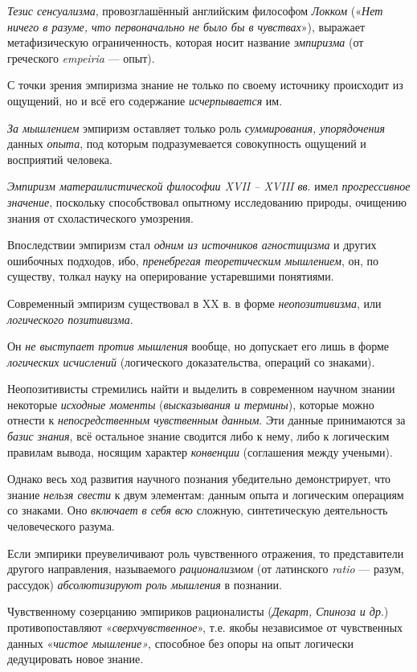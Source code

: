 \documentclass[a4paper,14pt,russian]{extreport}
\begin{document}
\emph{Тезис сенсуализма}, провозглашённый английским философом \emph{Локком} («\emph{Нет ничего в разуме, что первоначально не было бы в чувствах}»), выражает метафизическую ограниченность, которая носит название \emph{эмпиризма} (от греческого \emph{empeiria} --- опыт).

С точки зрения эмпиризма знание не только по своему источнику происходит из ощущений, но и всё его содержание \emph{исчерпывается} им.

\emph{За мышлением} эмпиризм оставляет только роль \emph{суммирования, упорядочения} данных \emph{опыта}, под которым подразумевается совокупность ощущений и восприятий человека.

\emph{Эмпиризм матераилистической философии XVII -- XVIII вв}. имел \emph{прогрессивное значение}, поскольку способствовал опытному исследованию природы, очищению знания от схоластического умозрения.

Впоследствии эмпиризм стал \emph{одним из источников агностицизма} и других ошибочных подходов, ибо, \emph{пренебрегая теоретическим мышлением}, он, по существу, толкал науку на оперирование устаревшими понятиями.

Современный эмпиризм существовал в XX в. в форме \emph{неопозитивизма}, или \emph{логического позитивизма}.

Он \emph{не выступает против мышления} вообще, но допускает его лишь в форме \emph{логических исчислений} (логического доказательства, операций со знаками).

Неопозитивисты стремились найти и выделить в современном научном знании некоторые \emph{исходные моменты} (\emph{высказывания и термины}), которые можно отнести к \emph{непосредственным чувственным данным}. Эти данные принимаются за \emph{базис знания}, всё остальное знание сводится либо к нему, либо к логическим правилам вывода, носящим характер \emph{конвенции} (соглашения между учеными).

Однако весь ход развития научного познания убедительно демонстрирует, что знание \emph{нельзя свести} к двум элементам: данным опыта и логическим операциям со знаками. Оно \emph{включает в себя всю} сложную, синтетическую деятельность человеческого разума.

Если эмпирики преувеличивают роль чувственного отражения, то представители другого направления, называемого \emph{рационализмом} (от латинского \emph{ratio} --- разум, рассудок) \emph{абсолютизируют роль мышления} в познании.

Чувственному созерцанию эмпириков рационалисты (\emph{Декарт, Спиноза и др}.) противопоставляют «\emph{сверхчувственное}», т.е. якобы независимое от чувственных данных «\emph{чистое мышление»}, способное без опоры на опыт логически дедуцировать новое знание.
\end{document}
